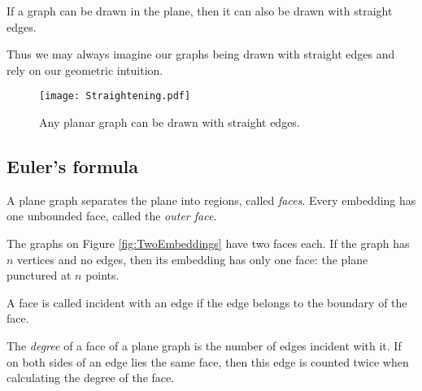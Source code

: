 \begin{page}
\setcounter{section}{3}
\setcounter{subsection}{1}
\setcounter{dfn}{4}
\label{portion:330}

\begin{thm}[F\'ary]
If a graph can be drawn in the plane, then it can also be drawn with straight edges.
\end{thm}

\end{page}

\begin{page}
\setcounter{section}{3}
\setcounter{subsection}{2}
\setcounter{dfn}{4}
\label{portion:331}

Thus we may always imagine our graphs being drawn with straight edges and rely on our geometric intuition.

\begin{figure}[ht]
\begin{center}
\texttt{[image: Straightening.pdf]}
\end{center}
\caption{Any planar graph can be drawn with straight edges.}
\label{fig:Straightening}
\end{figure}



\end{page}

\begin{page}
\setcounter{section}{3}
\setcounter{subsection}{2}
\setcounter{dfn}{4}
\label{portion:333}

\subsection{Euler's formula}
A plane graph separates the plane into regions, called \emph{faces}.
Every embedding has one unbounded face, called the \emph{outer face}.

The graphs on Figure \ref{fig:TwoEmbeddings} have two faces each.
If the graph has $n$ vertices and no edges, then its embedding has only one face: the plane punctured at $n$ points.

A face is called incident with an edge if the edge belongs to the boundary of the face.

\end{page}

\begin{page}
\setcounter{section}{3}
\setcounter{subsection}{2}
\setcounter{dfn}{5}
\label{portion:335}

\begin{dfn}
The \emph{degree} of a face of a plane graph is the number of edges incident with it.
If on both sides of an edge lies the same face, then this edge is counted twice when calculating the degree of the face.
\end{dfn}

\end{page}

